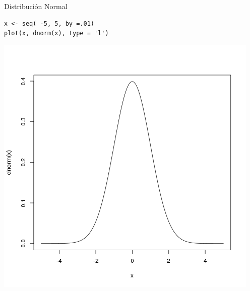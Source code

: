 \documentclass[xcolor={usenames,svgnames,dvipsnames}]{beamer}
\begin{document}
\begin{frame}[fragile,label=sec-3-4]{Distribución Normal}
 \lstset{language=R,label= ,caption= ,numbers=none}
\begin{lstlisting}
x <- seq( -5, 5, by =.01)
plot(x, dnorm(x), type = 'l')
\end{lstlisting}

\includegraphics[height=0.6\textheight]{figs/dnorm.png}
\end{frame}
\end{document}
